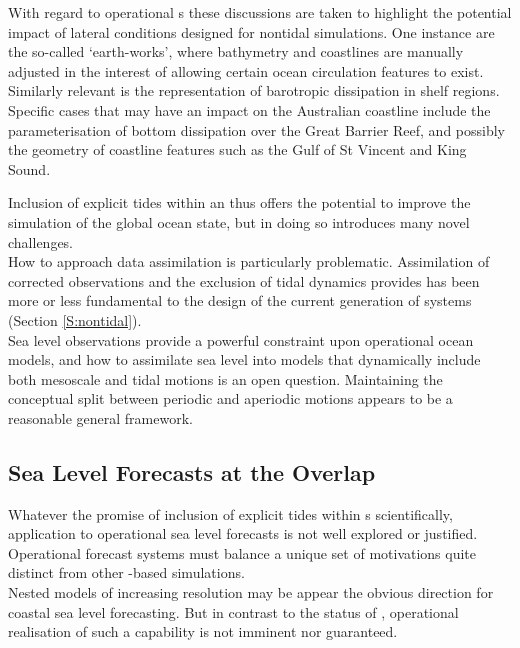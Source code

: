 With regard to operational \OGCM{}s these discussions are taken to highlight the potential impact of lateral conditions designed for nontidal simulations.  
One instance are the so-called `earth-works', where bathymetry and coastlines are manually adjusted in the interest of allowing certain ocean circulation features to exist.  
Similarly relevant is the representation of barotropic dissipation in shelf regions. 
Specific cases that may have an impact on the Australian coastline include the parameterisation of bottom dissipation over the Great Barrier Reef, and possibly the geometry of coastline features such as the Gulf of St Vincent and King Sound.




Inclusion of explicit tides within an \OGCM{} thus offers the potential to improve the simulation of the global ocean state, but in doing so introduces many novel challenges.\\
How to approach data assimilation is particularly problematic.  Assimilation of corrected observations and the exclusion of tidal dynamics provides has been more or less fundamental to the design of the current generation of \GODAE{} systems (Section \ref{S:nontidal}).\\
Sea level observations provide a powerful constraint upon operational ocean models, and how to assimilate sea level into models that dynamically include both mesoscale and tidal motions is an open question.   Maintaining the conceptual split between periodic and aperiodic motions appears to be a reasonable general framework.







\subsection{Sea Level Forecasts at the Overlap}
\label{S:fc_prospects}

Whatever the promise of inclusion of explicit tides within \OGCM{}s scientifically, application to operational sea level forecasts is not well explored or justified.
Operational forecast systems must balance a unique set of motivations quite distinct from other \OGCM{}-based simulations.  \\
Nested models of increasing resolution may be appear the obvious direction for coastal sea level forecasting.  But in contrast to the status of \BL{}, operational realisation of such a capability is not imminent nor guaranteed.


